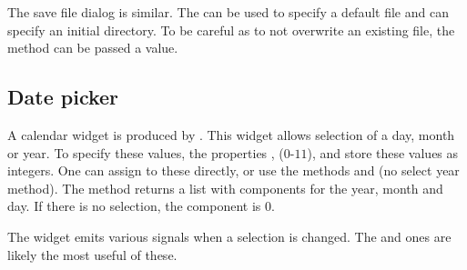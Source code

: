 The save file dialog is similar. The
 can be used to specify a
default file and  can specify an
initial directory. To be careful as to not overwrite an existing file, the
method  can be
passed a  value.

\subsection{Date picker}
\label{sec:RGkt2:date-picker}

A calendar widget is produced by . This
widget allows selection of a day, month or year. To specify these
values, the properties ,  ($0$-$11$), and
 store these values as integers. One can assign to these
directly, or use the methods
 and
 (no select year method). The method
 returns a list with components for the
year, month and day. If there is no selection, the 
component is $0$.

The widget emits various signals when a selection is changed. The
 and  ones are
likely the most useful of these.












